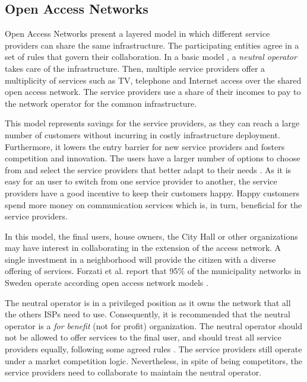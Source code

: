 \documentclass[journal]{IEEEtran}
\begin{document}
\subsection{Open Access Networks}

Open Access Networks present a layered model in which different service providers can share the same infrastructure.
The participating entities agree in a set of rules that govern their collaboration.
In a basic model \cite{battiti2005wireless}, a \emph{neutral operator} takes care of the infrastructure.
Then, multiple service providers offer a multiplicity of services such as TV, telephone and Internet access over the shared open access network.
The service providers use a share of their incomes to pay to the network operator for the common infrastructure.

This model represents savings for the service providers, as they can reach a large number of customers without incurring in costly infrastructure deployment.
Furthermore, it lowers the entry barrier for new service providers and fosters competition and innovation.
The users have a larger number of options to choose from and select the service providers that better adapt to their needs \cite{domingo2011med}.
As it is easy for an user to switch from one service provider to another, the service providers have a good incentive to keep their customers happy.
Happy customers spend more money on communication services which is, in turn, beneficial for the service providers.

In this model, the final users, house owners, the City Hall or other organizations may have interest in collaborating in the extension of the access network.
A single investment in a neighborhood will provide the citizen with a diverse offering of services.
Forzati et al. report that 95\% of the municipality networks in Sweden operate according open access network models \cite{forzati2010open}.

The neutral operator is in a privileged position as it owns the network that all the others ISPs need to use.
Consequently, it is recommended that the neutral operator is a \emph{for benefit} (not for profit) organization.
The neutral operator should not be allowed to offer services to the final user, and should treat all service providers equally, following some agreed rules \cite{battiti2005wireless}.
The service providers still operate under a market competition logic.
Nevertheless, in spite of being competitors, the service providers need to collaborate to maintain the neutral operator.
\end{document}
